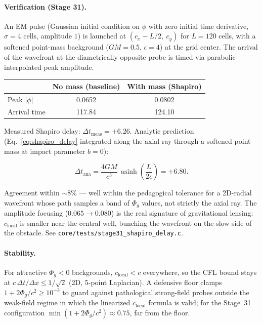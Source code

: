 \documentclass[11pt,a4paper]{article}
\newcommand{\Phig}{\Phi_g}
\begin{document}
\paragraph{Verification (Stage 31).}  An EM pulse (Gaussian initial
condition on $\phi$ with zero initial time derivative, $\sigma = 4$
cells, amplitude $1$) is launched at $(c_x - L/2,\ c_y)$ for $L = 120$
cells, with a softened point-mass background ($GM = 0.5$, $\epsilon = 4$)
at the grid center.  The arrival of the wavefront at the diametrically
opposite probe is timed via parabolic-interpolated peak amplitude.

\begin{center}
\begin{tabular}{@{}lcc@{}}
\toprule
                    & \textbf{No mass (baseline)} & \textbf{With mass (Shapiro)} \\
\midrule
Peak $|\phi|$       & 0.0652  & 0.0802 \\
Arrival time        & 117.84  & 124.10 \\
\bottomrule
\end{tabular}
\end{center}

Measured Shapiro delay: $\Delta t_{\mathrm{meas}} = +6.26$.  Analytic
prediction (Eq.~\ref{eq:shapiro_delay} integrated along the axial ray
through a softened point mass at impact parameter $b = 0$):

\begin{equation}
  \Delta t_{\mathrm{ana}} = \frac{4 G M}{c^3}\,
    \operatorname{asinh}\!\left(\frac{L}{2 \epsilon}\right) = +6.80.
\end{equation}

Agreement within $\sim 8\%$ --- well within the pedagogical tolerance for
a 2D-radial wavefront whose path samples a band of $\Phig$ values, not
strictly the axial ray.  The amplitude focusing ($0.065 \to 0.080$) is
the real signature of gravitational lensing: $c_{\mathrm{local}}$ is
smaller near the central well, bunching the wavefront on the slow side
of the obstacle.  See \texttt{core/tests/stage31\_shapiro\_delay.c}.

\paragraph{Stability.}  For attractive $\Phig < 0$ backgrounds,
$c_{\mathrm{local}} < c$ everywhere, so the CFL bound stays at
$c\,\Delta t / \Delta x \le 1/\sqrt{2}$ (2D, 5-point Laplacian).
A defensive floor clamps $1 + 2\Phig/c^2 \ge 10^{-3}$ to guard against
pathological strong-field probes outside the weak-field regime in
which the linearized $c_{\mathrm{local}}$ formula is valid; for the
Stage~31 configuration $\min(1 + 2\Phig/c^2) \approx 0.75$, far from
the floor.
\end{document}
